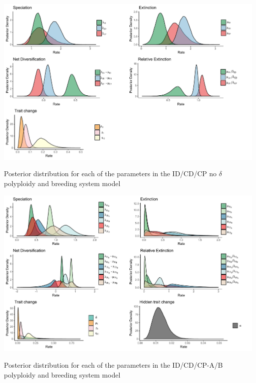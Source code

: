 \begin{suppfigure}
\includegraphics[width=\textwidth]{musseDPSInodipposteriordist.pdf}
\caption{Posterior distribution for each of the parameters in the ID/CD/CP no $\delta$ polyploidy and breeding system model} %
\label{suppfigure:IDCDCPnodip}
\end{suppfigure}

\begin{suppfigure}
\includegraphics[width=\textwidth]{muhisseDPSIposteriordist.pdf}
\caption{Posterior distribution for each of the parameters in the ID/CD/CP-A/B polyploidy and breeding system model} %
\label{suppfigure:IDCDCPAB}
\end{suppfigure}

